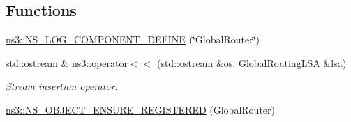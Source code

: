 \subsection*{Functions}
\begin{DoxyCompactItemize}
\item 
\hyperlink{namespacens3_a1e385c240b5f3e22f5e2e67f0757d7a9}{ns3\+::\+N\+S\+\_\+\+L\+O\+G\+\_\+\+C\+O\+M\+P\+O\+N\+E\+N\+T\+\_\+\+D\+E\+F\+I\+NE} (\char`\"{}Global\+Router\char`\"{})
\item 
std\+::ostream \& \hyperlink{namespacens3_a601770c73735f7f9002d8a1fc097d3c4}{ns3\+::operator$<$$<$} (std\+::ostream \&os, Global\+Routing\+L\+SA \&lsa)
\begin{DoxyCompactList}\small\item\em Stream insertion operator. \end{DoxyCompactList}\item 
\hyperlink{namespacens3_aa4d92379b4fcc607384e7c06912e0230}{ns3\+::\+N\+S\+\_\+\+O\+B\+J\+E\+C\+T\+\_\+\+E\+N\+S\+U\+R\+E\+\_\+\+R\+E\+G\+I\+S\+T\+E\+R\+ED} (Global\+Router)
\end{DoxyCompactItemize}

